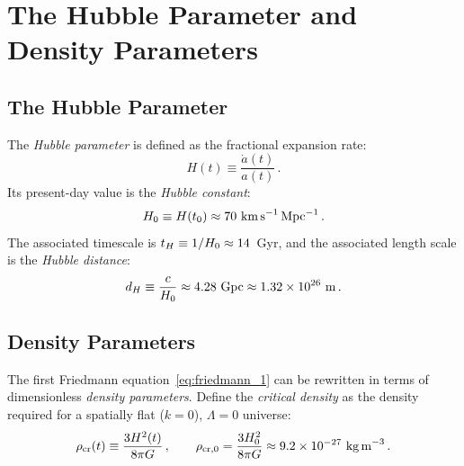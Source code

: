\section{The Hubble Parameter and Density Parameters}
\label{sec:hubble_density}

\subsection{The Hubble Parameter}

The \emph{Hubble parameter} is defined as the fractional expansion
rate:
\begin{equation}
    H(t) \equiv \frac{\dot{a}(t)}{a(t)} \,.
    \label{eq:hubble_parameter}
\end{equation}
Its present-day value is the \emph{Hubble constant}:
\begin{equation}
    H_0 \equiv H(t_0) \approx 70~\text{km\,s}^{-1}\,\text{Mpc}^{-1} \,.
    \label{eq:hubble_constant}
\end{equation}
The associated timescale is $t_H \equiv 1/H_0 \approx 14$~Gyr, and
the associated length scale is the \emph{Hubble distance}:
\begin{equation}
    d_H \equiv \frac{c}{H_0}
    \approx 4.28~\text{Gpc}
    \approx 1.32 \times 10^{26}~\text{m} \,.
    \label{eq:hubble_distance}
\end{equation}

\subsection{Density Parameters}

The first Friedmann equation~\eqref{eq:friedmann_1} can be rewritten in
terms of dimensionless \emph{density parameters}.  Define the
\emph{critical density} as the density required for a spatially flat
($k = 0$), $\Lambda = 0$ universe:
\begin{equation}
    \rho_{\mathrm{cr}}(t) \equiv \frac{3H^2(t)}{8\pi G}
    \,, \qquad
    \rho_{\mathrm{cr},0} = \frac{3H_0^2}{8\pi G}
    \approx 9.2 \times 10^{-27}~\text{kg\,m}^{-3} \,.
    \label{eq:critical_density}
\end{equation}

